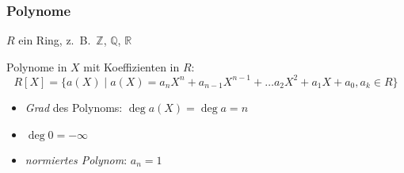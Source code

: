 %
%
%
\begin{frame}[t]
\frametitle{Polynome}
$R$ ein Ring, z.~B.~$\mathbb{Z}$, $\mathbb{Q}$, $\mathbb{R}$

\begin{definition}
Polynome in $X$ mit Koeffizienten in $R$:
\[
R[X]
=
\{
a(X)\;|\;
a(X) = a_nX^n+a_{n-1}X^{n-1} + \dots a_2X^2+a_1X + a_0, a_k\in R
\}
\]
\end{definition}

\begin{itemize}
\item {\em Grad} des Polynoms: $\deg a(X) = \deg a = n$
\item $\deg 0 = -\infty$
\item {\em normiertes Polynom}: $a_n=1$
\end{itemize}


\end{frame}
